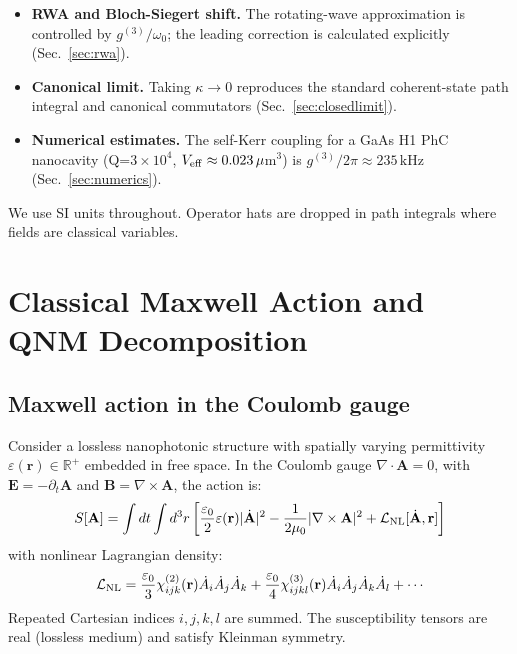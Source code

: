 \documentclass[12pt]{article}
\newcommand{\NL}{{\rm NL}}
\begin{document}
\begin{itemize}
  \item \textbf{RWA and Bloch-Siegert shift.}  The rotating-wave
    approximation is controlled by $g^{(3)}/\omega_0$; the leading
    correction is calculated explicitly (Sec.~\ref{sec:rwa}).

  \item \textbf{Canonical limit.}  Taking $\kappa\to 0$ reproduces the
    standard coherent-state path integral and canonical commutators
    (Sec.~\ref{sec:closedlimit}).

  \item \textbf{Numerical estimates.}  The self-Kerr coupling for a
    GaAs H1 PhC nanocavity (Q=$3\times10^4$, $V_{\rm eff}\approx0.023\,\mu$m$^3$)
    is $g^{(3)}/2\pi\approx 235\,\mathrm{kHz}$ (Sec.~\ref{sec:numerics}).
\end{itemize}

We use SI units throughout.  Operator hats are dropped in path integrals
where fields are classical variables.

\section{Classical Maxwell Action and QNM Decomposition}
\label{sec:classical}

\subsection{Maxwell action in the Coulomb gauge}

Consider a lossless nanophotonic structure with spatially varying
permittivity $\varepsilon(\mathbf{r})\in\mathbb{R}^+$ embedded in free
space.  In the Coulomb gauge $\nabla\cdot\mathbf{A}=0$, with
$\mathbf{E}=-\partial_t\mathbf{A}$ and $\mathbf{B}=\nabla\times\mathbf{A}$,
the action is:
\begin{equation}
  S[\mathbf{A}] = \int dt\int d^3r
  \left[\frac{\varepsilon_0}{2}\varepsilon(\mathbf{r})|\dot{\mathbf{A}}|^2
  -\frac{1}{2\mu_0}|\nabla\times\mathbf{A}|^2
  +\mathcal{L}_\NL[\dot{\mathbf{A}},\mathbf{r}]\right]
  \label{eq:maxwell_action}
\end{equation}
with nonlinear Lagrangian density:
\begin{equation}
  \mathcal{L}_\NL = \frac{\varepsilon_0}{3}\chi^{(2)}_{ijk}(\mathbf{r})
  \dot{A}_i\dot{A}_j\dot{A}_k
  +\frac{\varepsilon_0}{4}\chi^{(3)}_{ijkl}(\mathbf{r})
  \dot{A}_i\dot{A}_j\dot{A}_k\dot{A}_l+\cdots
  \label{eq:Lagrangian_NL}
\end{equation}
Repeated Cartesian indices $i,j,k,l$ are summed.  The susceptibility
tensors are real (lossless medium) and satisfy Kleinman symmetry.
\end{document}
